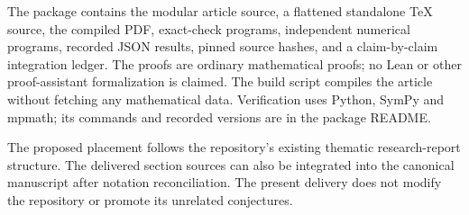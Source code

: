 The package contains the modular article source, a flattened
standalone TeX source, the compiled PDF, exact-check programs,
independent numerical programs, recorded JSON results, pinned source
hashes, and a claim-by-claim integration ledger. The proofs are
ordinary mathematical proofs; no Lean or other proof-assistant
formalization is claimed. The build script compiles the article
without fetching any mathematical data. Verification uses Python,
SymPy and mpmath; its commands and recorded versions are in the
package README.

The proposed placement follows the repository's existing thematic
research-report structure. The delivered section sources can also be
integrated into the canonical manuscript after notation reconciliation.
The present delivery does not modify the repository or promote its
unrelated conjectures.
